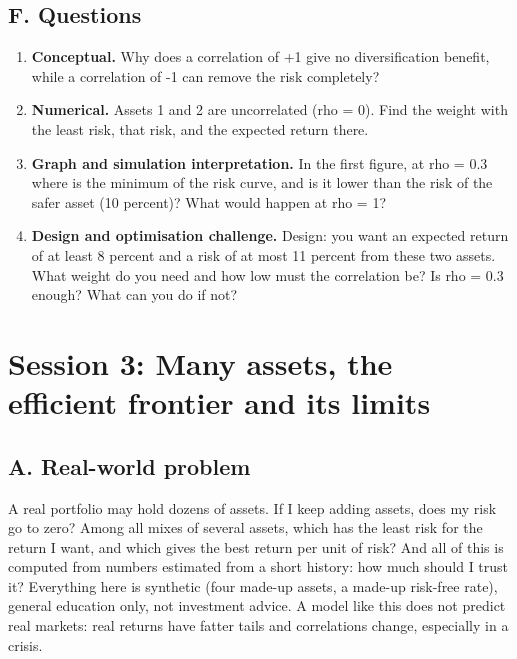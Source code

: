 \documentclass[11pt,a4paper]{article}
\begin{document}
\subsection*{F. Questions}
\begin{enumerate}[nosep]
\item \textbf{Conceptual.} Why does a correlation of +1 give no diversification benefit, while a correlation of -1 can remove the risk completely?
\item \textbf{Numerical.} Assets 1 and 2 are uncorrelated (rho = 0). Find the weight with the least risk, that risk, and the expected return there.
\item \textbf{Graph and simulation interpretation.} In the first figure, at rho = 0.3 where is the minimum of the risk curve, and is it lower than the risk of the safer asset (10 percent)? What would happen at rho = 1?
\item \textbf{Design and optimisation challenge.} Design: you want an expected return of at least 8 percent and a risk of at most 11 percent from these two assets. What weight do you need and how low must the correlation be? Is rho = 0.3 enough? What can you do if not?
\end{enumerate}

\section{Session 3: Many assets, the efficient frontier and its limits}

\subsection*{A. Real-world problem}
A real portfolio may hold dozens of assets. If I keep adding assets, does my risk go to zero? Among all mixes of several assets, which has the least risk for the return I want, and which gives the best return per unit of risk? And all of this is computed from numbers estimated from a short history: how much should I trust it? Everything here is synthetic (four made-up assets, a made-up risk-free rate), general education only, not investment advice. A model like this does not predict real markets: real returns have fatter tails and correlations change, especially in a crisis.
\end{document}
